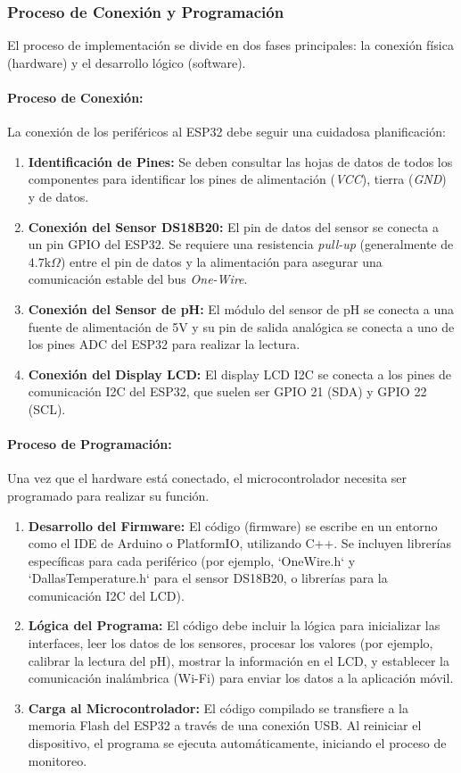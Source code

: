 \documentclass[a4paper,12pt]{article}
\begin{document}
	\subsubsection{Proceso de Conexión y Programación}
	El proceso de implementación se divide en dos fases principales: la conexión física (hardware) y el desarrollo lógico (software).
	
	\paragraph{Proceso de Conexión:}
	La conexión de los periféricos al ESP32 debe seguir una cuidadosa planificación:
	\begin{enumerate}
		\item \textbf{Identificación de Pines:} Se deben consultar las hojas de datos de todos los componentes para identificar los pines de alimentación (\textit{VCC}), tierra (\textit{GND}) y de datos.
		\item \textbf{Conexión del Sensor DS18B20:} El pin de datos del sensor se conecta a un pin GPIO del ESP32. Se requiere una resistencia \textit{pull-up} (generalmente de $4.7\text{k}\Omega$) entre el pin de datos y la alimentación para asegurar una comunicación estable del bus \textit{One-Wire}.
		\item \textbf{Conexión del Sensor de pH:} El módulo del sensor de pH se conecta a una fuente de alimentación de 5V y su pin de salida analógica se conecta a uno de los pines ADC del ESP32 para realizar la lectura.
		\item \textbf{Conexión del Display LCD:} El display LCD I2C se conecta a los pines de comunicación I2C del ESP32, que suelen ser GPIO 21 (SDA) y GPIO 22 (SCL).
	\end{enumerate}
	
	\paragraph{Proceso de Programación:}
	Una vez que el hardware está conectado, el microcontrolador necesita ser programado para realizar su función.
	\begin{enumerate}
		\item \textbf{Desarrollo del Firmware:} El código (firmware) se escribe en un entorno como el IDE de Arduino o PlatformIO, utilizando C++. Se incluyen librerías específicas para cada periférico (por ejemplo, `OneWire.h` y `DallasTemperature.h` para el sensor DS18B20, o librerías para la comunicación I2C del LCD).
		\item \textbf{Lógica del Programa:} El código debe incluir la lógica para inicializar las interfaces, leer los datos de los sensores, procesar los valores (por ejemplo, calibrar la lectura del pH), mostrar la información en el LCD, y establecer la comunicación inalámbrica (Wi-Fi) para enviar los datos a la aplicación móvil.
		\item \textbf{Carga al Microcontrolador:} El código compilado se transfiere a la memoria Flash del ESP32 a través de una conexión USB. Al reiniciar el dispositivo, el programa se ejecuta automáticamente, iniciando el proceso de monitoreo.
	\end{enumerate}
	
\end{document}
